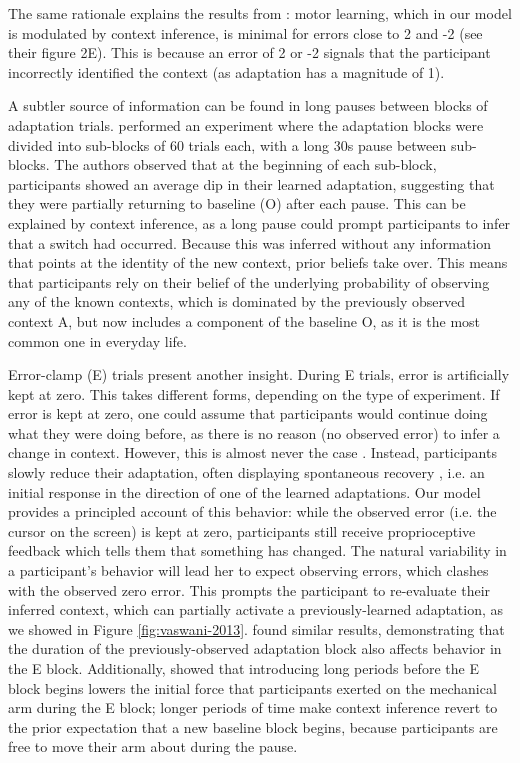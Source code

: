 \documentclass[a4paper,doc,floatsintext,natbib]{apa6}
\def \fref #1{Figure \ref{#1}}     %
\begin{document}
The same rationale explains the results from \cite{Davidson_Scaling_2004}: motor learning, which in our model is modulated by context inference, is minimal for errors close to 2 and -2 (see their figure 2E). This is because an error of 2 or -2 signals that the participant incorrectly identified the context (as adaptation has a magnitude of 1).

A subtler source of information can be found in long pauses between blocks of adaptation trials. \cite{Ethier_Spontaneous_2008} performed an experiment where the adaptation blocks were divided into sub-blocks of 60 trials each, with a long 30s pause between sub-blocks. The authors observed that at the beginning of each sub-block, participants showed an average dip in their learned adaptation, suggesting that they were partially returning to baseline (O) after each pause. This can be explained by context inference, as a long pause could prompt participants to infer that a switch had occurred. Because this was inferred without any information that points at the identity of the new context, prior beliefs take over. This means that participants rely on their belief of the underlying probability of observing any of the known contexts, which is dominated by the previously observed context A, but now includes a component of the baseline O, as it is the most common one in everyday life.

Error-clamp (E) trials present another insight. During E trials, error is artificially kept at zero. This takes different forms, depending on the type of experiment. If error is kept at zero, one could assume that participants would continue doing what they were doing before, as there is no reason (no observed error) to infer a change in context. However, this is almost never the case \cite[e.g.][]{Smith_Interacting_2006,Ethier_Spontaneous_2008,Forano_Timescales_2020,Vaswani_Decay_2013,Scheidt_Persistence_2000,Pekny_Protection_2011}. Instead, participants slowly reduce their adaptation, often displaying spontaneous recovery \cite[e.g.][]{Smith_Interacting_2006}, i.e. an initial response in the direction of one of the learned adaptations. Our model provides a principled account of this behavior: while the observed error (i.e. the cursor on the screen) is kept at zero, participants still receive proprioceptive feedback which tells them that something has changed. The natural variability in a participant's behavior will lead her to expect observing errors, which clashes with the observed zero error. This prompts the participant to re-evaluate their inferred context, which can partially activate a previously-learned adaptation, as we showed in \fref{fig:vaswani-2013}. \cite{Pekny_Protection_2011} found similar results, demonstrating that the duration of the previously-observed adaptation block also affects behavior in the E block. Additionally, \cite{Criscimagna-Hemminger_Consolidation_2008} showed that introducing long periods before the E block begins lowers the initial force that participants exerted on the mechanical arm during the E block; longer periods of time make context inference revert to the prior expectation that a new baseline block begins, because participants are free to move their arm about during the pause.
\end{document}
